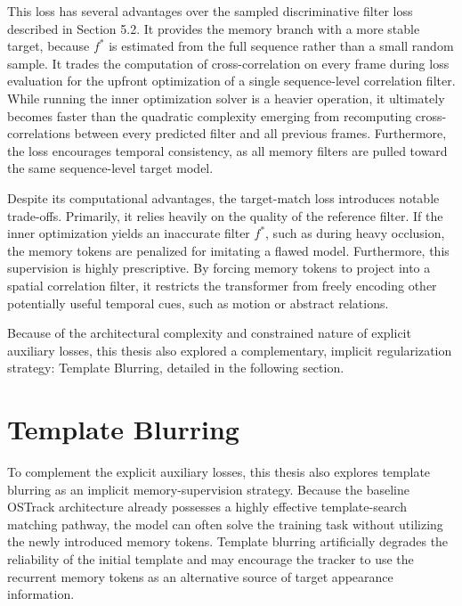\documentclass[bachelorthesis]{fer}
\numberwithin{equation}{chapter}
\begin{document}
    This loss has several advantages over the sampled discriminative filter loss described in Section 5.2. It provides the
    memory branch with a more stable target, because \(f^*\) is estimated from the full sequence rather than a small random
    sample. It trades the computation of cross-correlation on every frame during loss evaluation for the upfront
    optimization of a single sequence-level correlation filter. While running the inner optimization solver is a heavier
    operation, it ultimately becomes faster than the quadratic complexity emerging from recomputing cross-correlations
    between every predicted filter and all previous frames. Furthermore, the loss encourages temporal consistency, as all
    memory filters are pulled toward the same sequence-level target model.

    Despite its computational advantages, the target-match loss introduces notable trade-offs. Primarily, it relies heavily
    on the quality of the reference filter. If the inner optimization yields an inaccurate filter \(f^*\), such as during heavy
    occlusion, the memory tokens are penalized for imitating a flawed model. Furthermore, this supervision is highly
    prescriptive. By forcing memory tokens to project into a spatial correlation filter, it restricts the transformer from
    freely encoding other potentially useful temporal cues, such as motion or abstract relations.

    Because of the architectural complexity and constrained nature of explicit auxiliary losses, this thesis also explored a complementary, implicit regularization strategy: Template Blurring, detailed in the following section.


    \section{Template Blurring}\label{template-blurring}

    To complement the explicit auxiliary losses, this thesis also explores template blurring as an implicit
    memory-supervision
    strategy. Because the baseline OSTrack architecture already possesses a highly effective template-search matching
    pathway, the model can often solve the training task without utilizing the newly introduced memory tokens. Template
    blurring artificially degrades the reliability of the initial template and may encourage the tracker to use the recurrent
    memory tokens as an alternative source of target appearance information.
\end{document}
